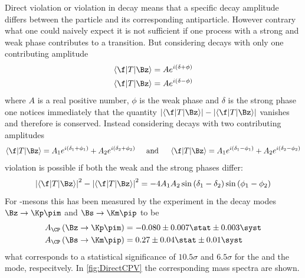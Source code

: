Direct \CP violation or \CP violation in decay means that a specific decay amplitude differs between the particle and  its corresponding antiparticle.
However contrary what one could naively expect it is not sufficient if one process with a strong and weak phase contributes to a transition.
But considering decays with only one contributing amplitude
\begin{equation}
\begin{split}
\left<\f|T|\Bz\right>&=Ae^{i\left(\delta+\phi\right)}\\
\left<\f|T|\Bz\right>&=Ae^{i\left(\delta-\phi\right)}
\end{split}
\end{equation}
where $A$ is a real positive number, $\phi$ is the weak phase and $\delta$ is the strong phase one notices immediately that the quantity $\left|\left<\f|T|\Bz\right>\right|-\left|\left<\f|T|\Bz\right>\right|$ vanishes and therefore \CP is conserved.
Instead considering decays with two contributing amplitudes
\begin{equation}
\left<\f|T|\Bz\right>=A_1e^{i\left(\delta_1+\phi_1\right)}+A_2e^{i\left(\delta_2+\phi_2\right)}\hspace{0.5cm}\text{and}\hspace{0.5cm}\left<\f|T|\Bz\right>=A_1e^{i\left(\delta_1-\phi_1\right)}+A_2e^{i\left(\delta_2-\phi_2\right)}
\end{equation}
\CP violation is possible if both the weak and the strong phases differ:
\begin{equation}
\left|\left<\f|T|\Bz\right>\right|^2-\left|\left<\f|T|\Bz\right>\right|^2=-4A_1A_2\sin\left(\delta_1-\delta_2\right)\sin\left(\phi_1-\phi_2\right)
\end{equation}
For \B-mesons this has been measured by the \lhcb experiment in the decay modes $\Bz\to\Kp\pim$ and $\Bs\to\Km\pip$ \cite{LHCb-PAPER-2013-018} to be
\begin{equation}
\begin{split}
A_{\CP}\left(\Bz\to\Kp\pim\right) &= -0.080\pm0.007\stat \pm 0.003\syst\\
A_{\CP}\left(\Bs\to\Km\pip\right) &= 0.27\pm0.04\stat \pm 0.01\syst
\end{split}
\end{equation}
what corresponds to a statistical significance of $10.5\sigma$ and $6.5\sigma$ for the \Bz and the \Bs mode, respecitvely.
In \cref{fig:DirectCPV} the corresponding mass spectra are shown.

